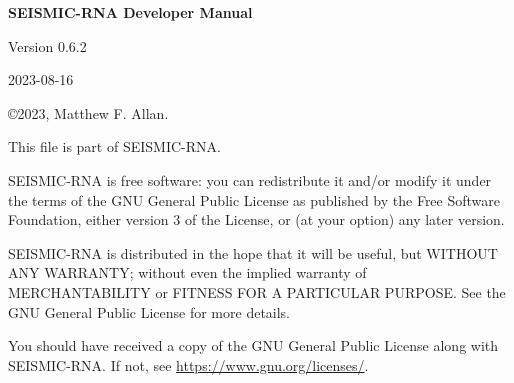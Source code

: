 \documentclass[main.tex]{subfiles}
\begin{document}
\begin{titlepage}

\begin{center}

\textbf{SEISMIC-RNA Developer Manual}

\vspace{0.5cm}

Version 0.6.2

2023-08-16

\end{center}

\vspace{1cm}

\noindent
\copyright 2023, Matthew F. Allan.

\vspace{0.5cm}

\noindent
This file is part of SEISMIC-RNA.

\vspace{0.25cm}

\noindent
SEISMIC-RNA is free software: you can redistribute it and/or modify it under the terms of the GNU General Public License as published by the Free Software Foundation, either version 3 of the License, or (at your option) any later version.

\vspace{0.25cm}

\noindent
SEISMIC-RNA is distributed in the hope that it will be useful, but WITHOUT ANY WARRANTY; without even the implied warranty of MERCHANTABILITY or FITNESS FOR A PARTICULAR PURPOSE. See the GNU General Public License for more details.

\vspace{0.25cm}

\noindent
You should have received a copy of the GNU General Public License along with SEISMIC-RNA. If not, see \url{https://www.gnu.org/licenses/}.

\end{titlepage}
\end{document}
